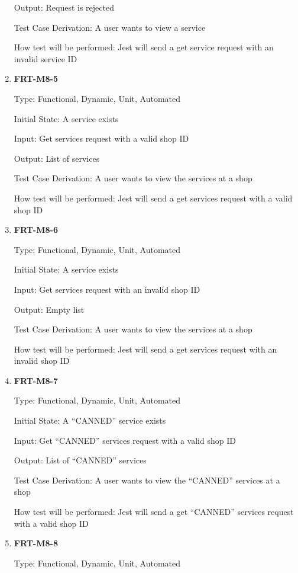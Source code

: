 \documentclass[12pt, titlepage]{article}
\begin{document}
\begin{enumerate}
	      Output: Request is rejected

	      Test Case Derivation: A user wants to view a service

	      How test will be performed: Jest will send a get service request with an invalid service ID

	\item \textbf{FRT-M8-5}

	      Type: Functional, Dynamic, Unit, Automated

	      Initial State: A service exists

	      Input: Get services request with a valid shop ID

	      Output: List of services

	      Test Case Derivation: A user wants to view the services at a shop

	      How test will be performed: Jest will send a get services request with a valid shop ID

	\item \textbf{FRT-M8-6}

	      Type: Functional, Dynamic, Unit, Automated

	      Initial State: A service exists

	      Input: Get services request with an invalid shop ID

	      Output: Empty list

	      Test Case Derivation: A user wants to view the services at a shop

	      How test will be performed: Jest will send a get services request with an invalid shop ID

	\item \textbf{FRT-M8-7}

	      Type: Functional, Dynamic, Unit, Automated

	      Initial State: A ``CANNED'' service exists

	      Input: Get ``CANNED'' services request with a valid shop ID

	      Output: List of ``CANNED'' services

	      Test Case Derivation: A user wants to view the ``CANNED'' services at a shop

	      How test will be performed: Jest will send a get ``CANNED'' services request with a valid shop ID

	\item \textbf{FRT-M8-8}

	      Type: Functional, Dynamic, Unit, Automated


\end{enumerate}
\end{document}

